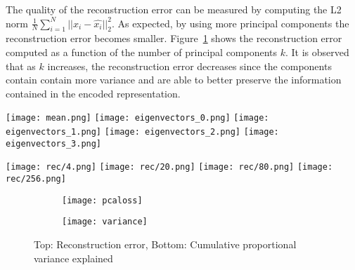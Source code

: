 \documentclass[conference,compsoc]{IEEEtran}
\begin{document}
The quality of the reconstruction error can be measured by computing the L2 norm $\frac{1}{N}\sum_{i=1}^{N}||x_i-\hat{x_i}||_2^2$. As expected, by using more principal components the reconstruction error becomes smaller. Figure~\ref{fig:pca3} shows the reconstruction error computed as a function of the number of principal components $k$. It is observed that as $k$ increases, the reconstruction error decreases since the components contain contain more variance and are able to better preserve the information contained in the encoded representation.



\begin{figure*}[!htb]
\centering
{}
  \texttt{[image: mean.png]}
\endminipage
\vspace{1mm}
  \texttt{[image: eigenvectors\_0.png]}
\endminipage
\vspace{1mm}
%
  \texttt{[image: eigenvectors\_1.png]}
\endminipage
\vspace{1mm}
%
  \texttt{[image: eigenvectors\_2.png]}
\endminipage
\vspace{1mm}
%
  \texttt{[image: eigenvectors\_3.png]}
\endminipage

\centering
{}
  \texttt{[image: rec/4.png]}
\endminipage
\vspace{1mm}
  \texttt{[image: rec/20.png]}
\endminipage
\vspace{1mm}
%
  \texttt{[image: rec/80.png]}
\endminipage
\vspace{1mm}
%
  \texttt{[image: rec/256.png]}
\endminipage
\caption{Top: mean image of the database and visualizations of the first 4 principal components (left to right). Bottom: Reconstructing the digit image by using 4, 20, 80 and 256 principal components (left to right)}
\label{fig:pca1}
\end{figure*}


 \begin{figure}
	\begin{subfigure}{8cm}
            \texttt{[image: pcaloss]}          
        \end{subfigure}
        \begin{subfigure}{8cm}
            \texttt{[image: variance]}            
        \end{subfigure}  
        \caption{Top: Reconstruction error, Bottom: Cumulative proportional variance explained}
                
        \label{fig:pca3}
    \end{figure}
\end{document}
